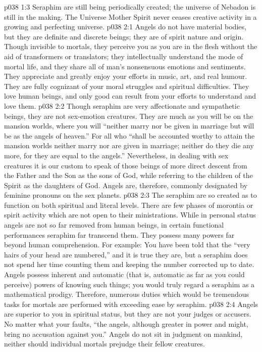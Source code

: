 \vs p038 1:3 Seraphim are still being periodically created; the universe of Nebadon is still in the making. The Universe Mother Spirit never ceases creative activity in a growing and perfecting universe.
\vs p038 2:1 Angels do not have material bodies, but they are definite and discrete beings; they are of spirit nature and origin. Though invisible to mortals, they perceive you as you are in the flesh without the aid of transformers or translators; they intellectually understand the mode of mortal life, and they share all of man’s nonsensuous emotions and sentiments. They appreciate and greatly enjoy your efforts in music, art, and real humour. They are fully cognizant of your moral struggles and spiritual difficulties. They love human beings, and only good can result from your efforts to understand and love them.
\vs p038 2:2 \pc Though seraphim are very affectionate and sympathetic beings, they are not sex\hyp{}emotion creatures. They are much as you will be on the mansion worlds, where you will “neither marry nor be given in marriage but will be as the angels of heaven.” For all who “shall be accounted worthy to attain the mansion worlds neither marry nor are given in marriage; neither do they die any more, for they are equal to the angels.” Nevertheless, in dealing with sex creatures it is our custom to speak of those beings of more direct descent from the Father and the Son as the sons of God, while referring to the children of the Spirit as the daughters of God. Angels are, therefore, commonly designated by feminine pronouns on the sex planets.
\vs p038 2:3 The seraphim are so created as to function on both spiritual and literal levels. There are few phases of morontia or spirit activity which are not open to their ministrations. While in personal status angels are not so far removed from human beings, in certain functional performances seraphim far transcend them. They possess many powers far beyond human comprehension. For example: You have been told that the “very hairs of your head are numbered,” and it is true they are, but a seraphim does not spend her time counting them and keeping the number corrected up to date. Angels possess inherent and automatic (that is, automatic as far as you could perceive) powers of knowing such things; you would truly regard a seraphim as a mathematical prodigy. Therefore, numerous duties which would be tremendous tasks for mortals are performed with exceeding ease by seraphim.
\vs p038 2:4 \pc Angels are superior to you in spiritual status, but they are not your judges or accusers. No matter what your faults, “the angels, although greater in power and might, bring no accusation against you.” Angels do not sit in judgment on mankind, neither should individual mortals prejudge their fellow creatures.
